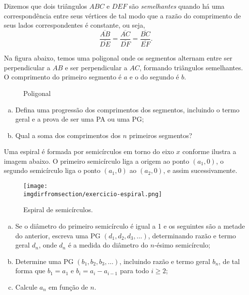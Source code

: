 \begin{exercise}
   Dizemos que dois triângulos $ABC$ e $DEF$ são \emph{semelhantes} quando há uma correspondência entre seus vértices de tal modo que a razão do comprimento de seus lados correspondentes é constante, ou seja,
   $$ \dfrac{\overline{AB}}{\overline{DE}} = \dfrac{\overline{AC}}{\overline{DF}} = \dfrac{\overline{BC}}{\overline{EF}}.$$

    Na figura abaixo, temos uma poligonal onde os segmentos alternam entre ser perpendicular a $AB$ e ser perpendicular a $AC$, formando triângulos semelhantes. O comprimento do primeiro segmento é $a$ e o do segundo é $b$.
    \begin{figure}[H]
	\centering
        \caption{Poligonal}
        \label{fig:my_label}
    \end{figure}
    \begin{enumerate}[a)]
        \item Defina uma progressão dos comprimentos dos segmentos, incluindo o termo geral e a prova de ser uma PA ou uma PG;
        \item Qual a soma dos comprimentos dos $n$ primeiros segmentos?
    \end{enumerate}
\end{exercise}

\begin{exercise}\label{ex:espiral}
    Uma espiral é formada por semicírculos em torno do eixo $x$ conforme ilustra a imagem abaixo. O primeiro semicírculo liga a origem ao ponto $(a_1, 0)$, o segundo semicírculo liga o ponto $(a_1, 0)$ ao $(a_2, 0)$, e assim sucessivamente.
    \begin{figure}[H]
        \centering
        \label{fig:exercicio-espiral}
        \texttt{[image: \\imgdirfromsection/exercicio-espiral.png]}
		\caption{Espiral de semicírculos.}
    \end{figure}
    \begin{enumerate}[a)]
        \item Se o diâmetro do primeiro semicírculo é igual a 1 e os seguintes são a metade do anterior, escreva uma PG $(d_1, d_2, d_3 , \dots)$, determinando razão e termo geral $d_n$, onde $d_n$ é a medida do diâmetro do $n$-ésimo semicírculo;
        \item Determine uma PG $(b_1, b_2, b_3 , \dots)$, incluindo razão e termo geral $b_n$, de tal forma que $b_1 = a_1$ e $b_i = a_i - a_{i-1}$ para todo $i \geq 2$;
        \item Calcule $a_n$ em função de $n$.
        \end{enumerate}
\end{exercise}

